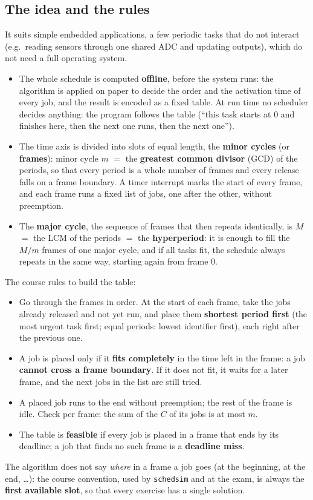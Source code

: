 \subsection{The idea and the rules}
It suits simple embedded applications, a few periodic tasks that do not interact (e.g.\ reading sensors through one shared ADC and updating outputs), which do not need a full operating system.
\begin{itemize}
    \item The whole schedule is computed \textbf{offline}, before the system runs: the algorithm is applied on paper to decide the order and the activation time of every job, and the result is encoded as a fixed table. At run time no scheduler decides anything: the program follows the table (``this task starts at 0 and finishes here, then the next one runs, then the next one'').
    \item The time axis is divided into slots of equal length, the \textbf{minor cycles} (or \textbf{frames}): minor cycle $m$ $=$ the \textbf{greatest common divisor} (GCD) of the periods, so that every period is a whole number of frames and every release falls on a frame boundary. A timer interrupt marks the start of every frame, and each frame runs a fixed list of jobs, one after the other, without preemption.
    \item The \textbf{major cycle}, the sequence of frames that then repeats identically, is $M$ $=$ the LCM of the periods $=$ the \textbf{hyperperiod}: it is enough to fill the $M/m$ frames of one major cycle, and if all tasks fit, the schedule always repeats in the same way, starting again from frame 0.
\end{itemize}
The course rules to build the table:
\begin{itemize}
    \item Go through the frames in order. At the start of each frame, take the jobs already released and not yet run, and place them \textbf{shortest period first} (the most urgent task first; equal periods: lowest identifier first), each right after the previous one.
    \item A job is placed only if it \textbf{fits completely} in the time left in the frame: a job \textbf{cannot cross a frame boundary}. If it does not fit, it waits for a later frame, and the next jobs in the list are still tried.
    \item A placed job runs to the end without preemption; the rest of the frame is idle. Check per frame: the sum of the $C$ of its jobs is at most $m$.
    \item The table is \textbf{feasible} if every job is placed in a frame that ends by its deadline; a job that finds no such frame is a \textbf{deadline miss}.
\end{itemize}
The algorithm does not say \emph{where} in a frame a job goes (at the beginning, at the end, \dots): the course convention, used by \texttt{schedsim} and at the exam, is always the \textbf{first available slot}, so that every exercise has a single solution.

